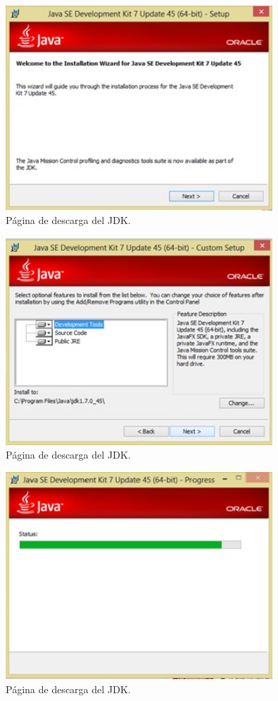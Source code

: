 \documentclass[12pt]{book} %
\begin{document}
\begin{enumerate}
	\begin{figure}[h!]
		\centering
			\includegraphics[width=10cm]{ins3.jpg}
			\caption{P\'agina de descarga del JDK.}
		
	\end{figure}
	\begin{figure}[h!]
		\centering
			\includegraphics[width=10cm]{ins4.jpg}
			\caption{P\'agina de descarga del JDK.}
		
	\end{figure}
	\begin{figure}[h!]
		\centering
			\includegraphics[width=10cm]{ins5.jpg}
			\caption{P\'agina de descarga del JDK.}
		

\end{figure}
\end{enumerate}
\end{document}
